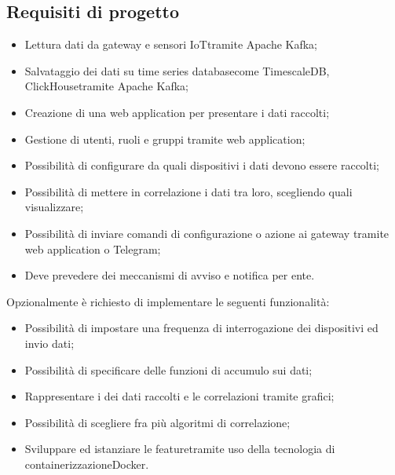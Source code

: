 \subsection{Requisiti di progetto}
\begin{itemize}
	\item Lettura dati da gateway e sensori IoT\glosp tramite Apache Kafka\glo;
	\item Salvataggio dei dati su time series database\glosp come TimescaleDB\glo, ClickHouse\glosp tramite Apache Kafka\glo;
	\item Creazione di una web application per presentare i dati raccolti;
	\item Gestione di utenti, ruoli e gruppi tramite web application;
	\item Possibilità di configurare da quali dispositivi i dati devono essere raccolti;
	\item Possibilità di mettere in correlazione i dati tra loro, scegliendo quali visualizzare;
	\item Possibilità di inviare comandi di configurazione o azione ai gateway tramite web application o Telegram\glo;
	\item Deve prevedere dei meccanismi di avviso e notifica per ente.
\end{itemize}
Opzionalmente è richiesto di implementare le seguenti funzionalità:
\begin{itemize}
	\item Possibilità di impostare una frequenza di interrogazione dei dispositivi ed invio dati;
	\item Possibilità di specificare delle funzioni di accumulo sui dati;
	\item Rappresentare i dei dati raccolti e le correlazioni tramite grafici;
	\item Possibilità di scegliere fra più algoritmi di correlazione;
	\item Sviluppare ed istanziare le feature\glosp tramite uso della tecnologia di containerizzazione\glosp Docker\glo.
\end{itemize}

